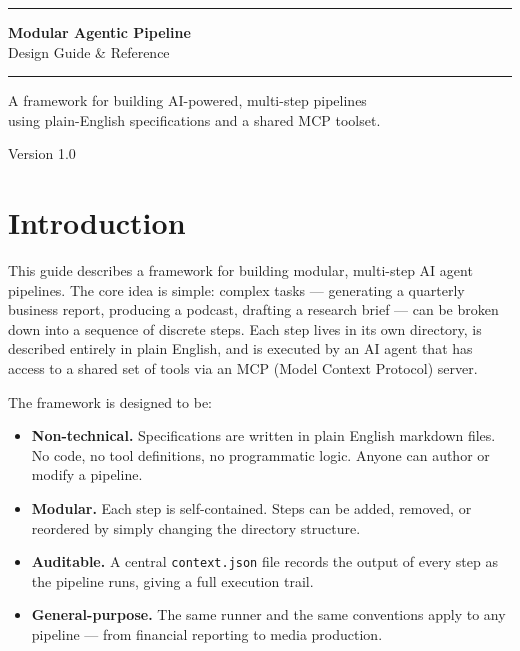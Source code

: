 \documentclass[12pt, a4paper]{article}
\begin{document}
\begin{titlepage}
  \centering
  \vspace*{3cm}
  {\color{primary}\rule{\linewidth}{2pt}}
  \vspace{1cm}

  {\Huge\bfseries\color{darktext} Modular Agentic Pipeline}\\[0.5em]
  {\Large\color{mutedtext} Design Guide \& Reference}

  \vspace{1cm}
  {\color{primary}\rule{\linewidth}{2pt}}

  \vspace{2cm}
  {\large\color{mutedtext}
    A framework for building AI-powered, multi-step pipelines\\
    using plain-English specifications and a shared MCP toolset.
  }

  \vfill
  {\small\color{mutedtext} Version 1.0}
\end{titlepage}

\tableofcontents
\newpage

\section{Introduction}

This guide describes a framework for building modular, multi-step AI agent pipelines. The core idea is simple: complex tasks — generating a quarterly business report, producing a podcast, drafting a research brief — can be broken down into a sequence of discrete steps. Each step lives in its own directory, is described entirely in plain English, and is executed by an AI agent that has access to a shared set of tools via an MCP (Model Context Protocol) server.

The framework is designed to be:

\begin{itemize}[leftmargin=1.5em]
  \item \textbf{Non-technical.} Specifications are written in plain English markdown files. No code, no tool definitions, no programmatic logic. Anyone can author or modify a pipeline.
  \item \textbf{Modular.} Each step is self-contained. Steps can be added, removed, or reordered by simply changing the directory structure.
  \item \textbf{Auditable.} A central \texttt{context.json} file records the output of every step as the pipeline runs, giving a full execution trail.
  \item \textbf{General-purpose.} The same runner and the same conventions apply to any pipeline — from financial reporting to media production.
\end{itemize}
\end{document}
